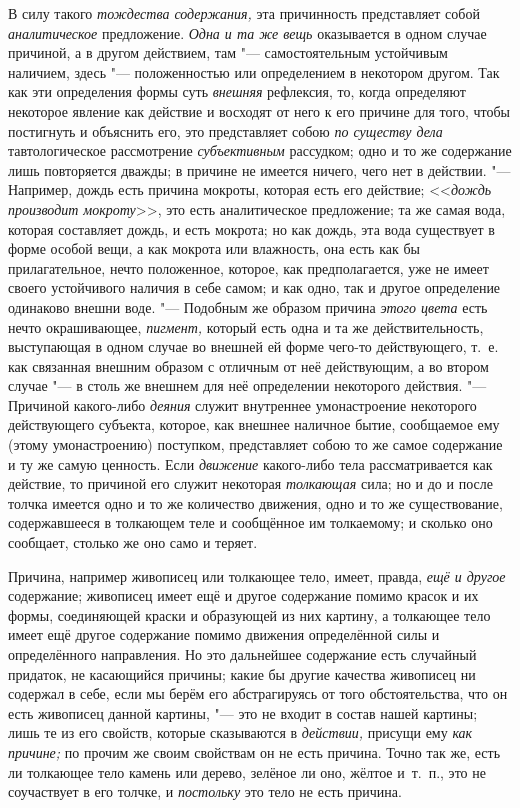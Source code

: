 В силу такого {\em тождества содержания,} эта причинность представляет собой
{\em аналитическое} предложение. {\em Одна и та же вещь} оказывается в одном
случае причиной, а в другом действием, там "--- самостоятельным устойчивым
наличием, здесь "--- положенностью или определением в некотором другом. Так как
эти определения формы суть {\em внешняя} рефлексия, то, когда определяют
некоторое явление как действие и восходят от него к его причине для того, чтобы
постигнуть и объяснить его, это представляет собою {\em по существу дела}
тавтологическое рассмотрение {\em субъективным} рассудком; одно и то же
содержание лишь повторяется дважды; в причине не имеется ничего, чего нет в
действии. "--- Например, дождь есть причина мокроты, которая есть его действие;
<<{\em дождь производит мокроту}>>, это есть аналитическое предложение; та же
самая вода, которая составляет дождь, и есть мокрота; но как дождь, эта вода
существует в форме особой вещи, а как мокрота или влажность, она есть как бы
прилагательное, нечто положенное, которое, как предполагается, уже не имеет
своего устойчивого наличия в себе самом; и как одно, так и другое определение
одинаково внешни воде. "--- Подобным же образом причина {\em этого цвета} есть
нечто окрашивающее, {\em пигмент,} который есть одна и та же действительность,
выступающая в одном случае во внешней ей форме чего-то действующего, т.~е. как
связанная внешним образом с отличным от неё действующим, а во втором случае
"--- в столь же внешнем для неё определении некоторого действия. "--- Причиной
какого-либо {\em деяния} служит внутреннее умонастроение некоторого
действующего субъекта, которое, как внешнее наличное бытие, сообщаемое ему
(этому умонастроению) поступком, представляет собою то же самое содержание и ту
же самую ценность. Если {\em движение} какого-либо тела рассматривается как
действие, то причиной его служит некоторая {\em толкающая} сила; но и до и
после толчка имеется одно и то же количество движения, одно и то же
существование, содержавшееся в толкающем теле и сообщённое им толкаемому; и
сколько оно сообщает, столько же оно само и теряет.

Причина, например живописец или толкающее тело, имеет, правда,
{\em ещё и другое} содержание; живописец имеет ещё и
другое содержание помимо красок и их формы, соединяющей краски и образующей
из них картину, а толкающее тело имеет ещё другое содержание помимо
движения определённой силы и определённого направления. Но это дальнейшее
содержание есть случайный придаток, не касающийся причины; какие бы другие
качества живописец ни содержал в себе, если мы берём его абстрагируясь от
того обстоятельства, что он есть живописец данной картины, "--- это не входит
в состав нашей картины; лишь те из его свойств, которые сказываются в
{\em действии,} присущи ему {\em как причине;} по прочим же своим свойствам
он не есть причина. Точно так же, есть ли толкающее тело камень или дерево,
зелёное ли оно, жёлтое и~т.~п., это не соучаствует в его толчке, и
{\em постольку} это тело не есть причина.

